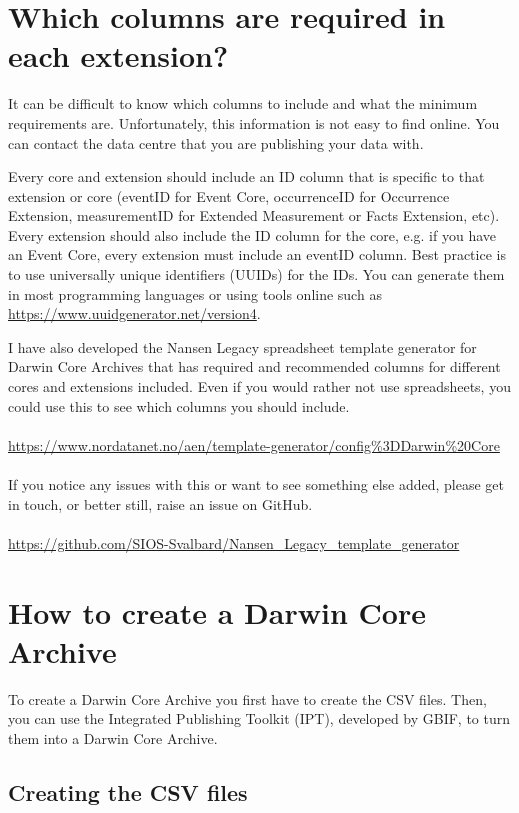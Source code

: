 \documentclass[a4paper,english, 11pt]{article}
\begin{document}
\section{Which columns are required in each extension?}
\label{s:required_columns}

It can be difficult to know which columns to include and what the minimum requirements are. Unfortunately, this information is not easy to find online. You can contact the data centre that you are publishing your data with.

Every core and extension should include an ID column that is specific to that extension or core (eventID for Event Core, occurrenceID for Occurrence Extension, measurementID for Extended Measurement or Facts Extension, etc). Every extension should also include the ID column for the core, e.g. if you have an Event Core, every extension must include an eventID column. Best practice is to use universally unique identifiers (UUIDs) for the IDs. You can generate them in most programming languages or using tools online such as \url{https://www.uuidgenerator.net/version4}.

I have also developed the Nansen Legacy spreadsheet template generator for Darwin Core Archives that has required and recommended columns for different cores and extensions included. Even if you would rather not use spreadsheets, you could use this to see which columns you should include.
\\
\\
\url{https://www.nordatanet.no/aen/template-generator/config%3DDarwin%20Core}
\\
\\
If you notice any issues with this or want to see something else added, please get in touch, or better still, raise an issue on GitHub.
\\
\\
\url{https://github.com/SIOS-Svalbard/Nansen_Legacy_template_generator}

\section{How to create a Darwin Core Archive}
\label{s:how}

To create a Darwin Core Archive you first have to create the CSV files. Then, you can use the Integrated Publishing Toolkit (IPT), developed by GBIF, to turn them into a Darwin Core Archive.

\subsection{Creating the CSV files}
\label{ss:CSVs}
\end{document}

